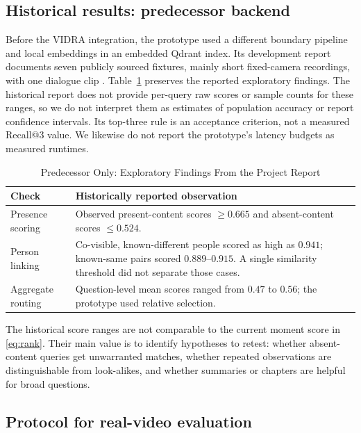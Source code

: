 \subsection{Historical results: predecessor backend}
\label{sec:legacy}
Before the VIDRA integration, the prototype used a different boundary pipeline and local embeddings in an embedded Qdrant index. Its development report documents seven publicly sourced fixtures, mainly short fixed-camera recordings, with one dialogue clip \cite{legacy}. Table~\ref{tab:legacy} preserves the reported exploratory findings. The historical report does not provide per-query raw scores or sample counts for these ranges, so we do not interpret them as estimates of population accuracy or report confidence intervals. Its top-three rule is an acceptance criterion, not a measured Recall@3 value. We likewise do not report the prototype's latency budgets as measured runtimes.

\begin{table}[!t]
\caption{Predecessor Only: Exploratory Findings From the Project Report \cite{legacy}}
\label{tab:legacy}
\centering
\small
\begin{tabularx}{\columnwidth}{@{}p{}X@{}}
\toprule
\textbf{Check} & \textbf{Historically reported observation} \\
\midrule
Presence scoring & Observed present-content scores $\geq 0.665$ and absent-content scores $\leq 0.524$. \\
Person linking & Co-visible, known-different people scored as high as $0.941$; known-same pairs scored $0.889$--$0.915$. A single similarity threshold did not separate those cases. \\
Aggregate routing & Question-level mean scores ranged from $0.47$ to $0.56$; the prototype used relative selection. \\
\bottomrule
\end{tabularx}
\end{table}

The historical score ranges are not comparable to the current moment score in \eqref{eq:rank}. Their main value is to identify hypotheses to retest: whether absent-content queries get unwarranted matches, whether repeated observations are distinguishable from look-alikes, and whether summaries or chapters are helpful for broad questions.

\subsection{Protocol for real-video evaluation}
\label{sec:protocol}

